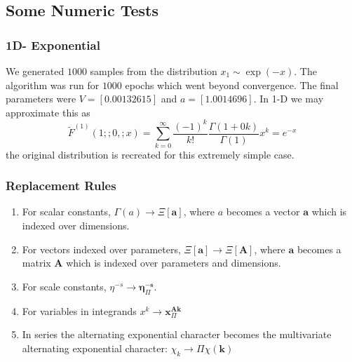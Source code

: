 \documentclass[journal=jcisd8,manuscript=article,layout=onecolumn,pdftex,floatfix,amsmath,amssymb,10pt]{achemso}
\begin{document}
\subsection{Some Numeric Tests}
\subsubsection{1D- Exponential}
We generated $1000$ samples from the distribution $x_1 \sim \exp(-x)$. The algorithm was run for $1000$ epochs which went beyond convergence. The final parameters were $V = [0.00132615]$ and $a=[1.0014696]$. In 1-D we may approximate this as \begin{equation}
\tilde{F}^{(1)}(1;;0,;x) = \sum_{k=0}^\infty \frac{(-1)^k}{k!} \frac{\Gamma(1+0k)}{\Gamma(1)} x^k = e^{-x}
\end{equation}
the original distribution is recreated for this extremely simple case.

\subsubsection{Replacement Rules}

\begin{enumerate}
\item For scalar constants, $\Gamma(a) \to \Xi[\mathbf{a}]$, where $a$ becomes a vector $\mathbf{a}$ which is indexed over dimensions.
\item For vectors indexed over parameters, $\Xi[\mathbf{a}] \to \Xi[\mathbf{A}]$, where $\mathbf{a}$ becomes a matrix $\mathbf{A}$ which is indexed over parameters and dimensions.
\item For scale constants, $\eta^{-s} \to \mathbf{\boldsymbol\eta}^{-\mathbf{s}}_\Pi$.
\item For variables in integrands $x^k \to \mathbf{x}^{\mathbf{Ak}}_\Pi$
\item In series the alternating exponential character becomes the multivariate alternating exponential character: $\chi_k \to \Pi\chi(\mathbf{k})$
\end{enumerate}
\end{document}

